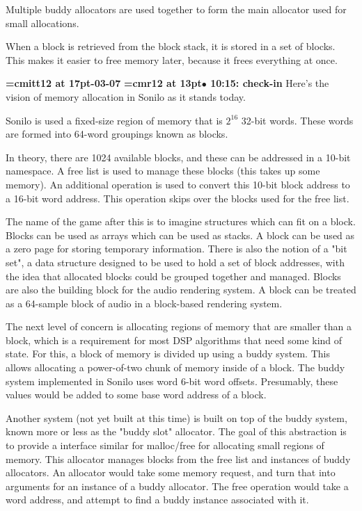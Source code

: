 Multiple buddy allocators are used together to form the main allocator used for small allocations.
\par

When a block is retrieved from the block stack, it is stored in a set of blocks. This makes it easier to free memory later, because it frees everything at once.
\par

{\medskip\noindent\bf\font\titlefont=cmitt12 at 17pt-03-07}\medskip
{\smallskip\noindent\bf\font\titlefont=cmr12 at 13pt\titlefont $\bullet$ 10:15: check-in}\smallskip
Here's the vision of memory allocation in Sonilo as it stands today.
\par

Sonilo is used a fixed-size region of memory that is $2^{16}$ 32-bit words. These words are formed into 64-word groupings known as blocks.
\par

In theory, there are 1024 available blocks, and these can be addressed in a 10-bit namespace. A free list is used to manage these blocks (this takes up some memory). An additional operation is used to convert this 10-bit block address to a 16-bit word address. This operation skips over the blocks used for the free list.
\par

The name of the game after this is to imagine structures which can fit on a block. Blocks can be used as arrays which can be used as stacks. A block can be used as a zero page for storing temporary information. There is also the notion of a "bit set", a data structure designed to be used to hold a set of block addresses, with the idea that allocated blocks could be grouped together and managed. Blocks are also the building block for the audio rendering system. A block can be treated as a 64-sample block of audio in a block-based rendering system.
\par

The next level of concern is allocating regions of memory that are smaller than a block, which is a requirement for most DSP algorithms that need some kind of state. For this, a block of memory is divided up using a buddy system. This allows allocating a power-of-two chunk of memory inside of a block. The buddy system implemented in Sonilo uses word 6-bit word offsets. Presumably, these values would be added to some base word address of a block.
\par

Another system (not yet built at this time) is built on top of the buddy system, known more or less as the "buddy slot" allocator. The goal of this abstraction is to provide a interface similar for malloc/free for allocating small regions of memory. This allocator manages blocks from the free list and instances of buddy allocators. An allocator would take some memory request, and turn that into arguments for an instance of a buddy allocator. The free operation would take a word address, and attempt to find a buddy instance associated with it.
\par

